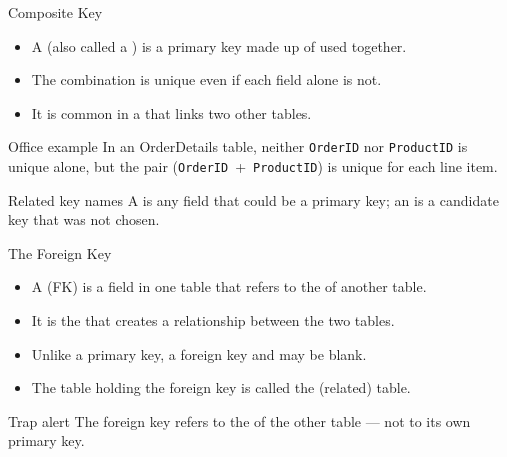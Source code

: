 \documentclass[aspectratio=169]{beamer}
\begin{document}
\begin{frame}{Composite Key}
  \begin{itemize}
    \item A  (also called a ) is a
      primary key made up of  used together.
    \item The combination is unique even if each field alone is not.
    \item It is common in a  that links two other tables.
  \end{itemize}
  \begin{exampleblock}{Office example}
    In an OrderDetails table, neither \texttt{OrderID} nor \texttt{ProductID}
    is unique alone, but the pair
    (\texttt{OrderID}~+~\texttt{ProductID}) is unique for each line item.
  \end{exampleblock}
  \begin{block}{Related key names}
    A  is any field that could be a primary key; an
     is a candidate key that was not chosen.
  \end{block}
\end{frame}

\begin{frame}{The Foreign Key}
  \begin{itemize}
    \item A  (FK) is a field in one table that refers to the
       of another table.
    \item It is the  that creates a relationship between the two
      tables.
    \item Unlike a primary key, a foreign key  and may be
      blank.
    \item The table holding the foreign key is called the
       (related) table.
  \end{itemize}
  \begin{alertblock}{Trap alert}
    The foreign key refers to the  of the other table --- not
    to its own primary key.
  \end{alertblock}
\end{frame}
\end{document}
